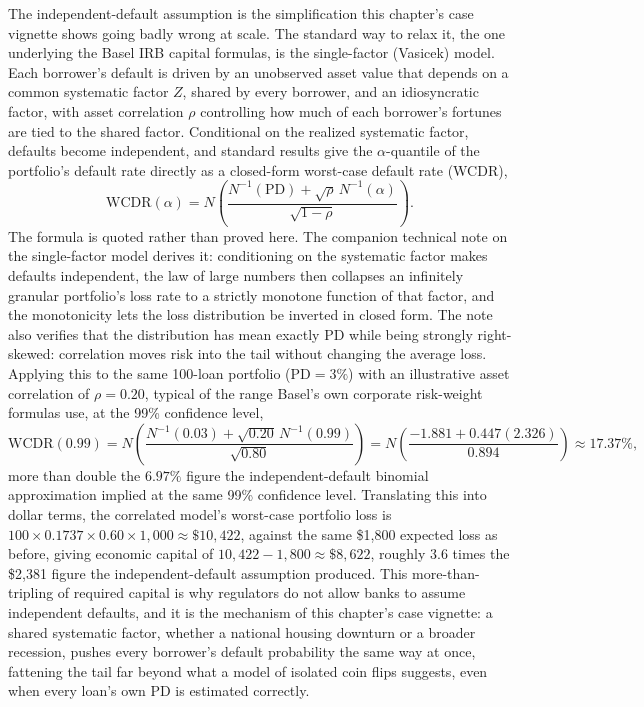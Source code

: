 \documentclass[../ai_in_finance]{subfiles}
\begin{document}
The independent-default assumption is the simplification this chapter's case vignette shows going badly wrong at scale. The standard way to relax it, the one underlying the Basel IRB capital formulas, is the single-factor (Vasicek) model. Each borrower's default is driven by an unobserved asset value that depends on a common systematic factor $Z$, shared by every borrower, and an idiosyncratic factor, with asset correlation $\rho$ controlling how much of each borrower's fortunes are tied to the shared factor. Conditional on the realized systematic factor, defaults become independent, and standard results give the $\alpha$-quantile of the portfolio's default rate directly as a closed-form worst-case default rate (WCDR),
\begin{equation}
\label{eq:creditrisk-wcdr}
\text{WCDR}(\alpha) = N\!\left(\frac{N^{-1}(\text{PD}) + \sqrt{\rho}\,N^{-1}(\alpha)}{\sqrt{1-\rho}}\right).
\end{equation}
The formula is quoted rather than proved here. The companion technical note on the single-factor model derives it: conditioning on the systematic factor makes defaults independent, the law of large numbers then collapses an infinitely granular portfolio's loss rate to a strictly monotone function of that factor, and the monotonicity lets the loss distribution be inverted in closed form. The note also verifies that the distribution has mean exactly $\text{PD}$ while being strongly right-skewed: correlation moves risk into the tail without changing the average loss.
Applying this to the same 100-loan portfolio ($\text{PD}=3\%$) with an illustrative asset correlation of $\rho=0.20$, typical of the range Basel's own corporate risk-weight formulas use, at the 99\% confidence level,
\begin{equation*}
\text{WCDR}(0.99) = N\!\left(\frac{N^{-1}(0.03) + \sqrt{0.20}\,N^{-1}(0.99)}{\sqrt{0.80}}\right) = N\!\left(\frac{-1.881 + 0.447(2.326)}{0.894}\right) \approx 17.37\%,
\end{equation*}
more than double the $6.97\%$ figure the independent-default binomial approximation implied at the same 99\% confidence level. Translating this into dollar terms, the correlated model's worst-case portfolio loss is $100 \times 0.1737 \times 0.60 \times 1{,}000 \approx \$10{,}422$, against the same \$1,800 expected loss as before, giving economic capital of $10{,}422 - 1{,}800 \approx \$8{,}622$, roughly $3.6$ times the \$2,381 figure the independent-default assumption produced.
This more-than-tripling of required capital is why regulators do not allow banks to assume independent defaults, and it is the mechanism of this chapter's case vignette: a shared systematic factor, whether a national housing downturn or a broader recession, pushes every borrower's default probability the same way at once, fattening the tail far beyond what a model of isolated coin flips suggests, even when every loan's own PD is estimated correctly.
\end{document}
